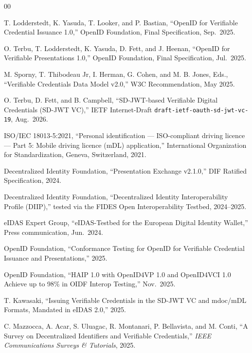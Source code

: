 \documentclass[conference]{IEEEtran}
\begin{document}
\begin{thebibliography}{00}

 T. Lodderstedt, K. Yasuda, T. Looker, and P. Bastian, ``OpenID for Verifiable Credential Issuance 1.0,'' OpenID Foundation, Final Specification, Sep.\ 2025.

 O. Terbu, T. Lodderstedt, K. Yasuda, D. Fett, and J. Heenan, ``OpenID for Verifiable Presentations 1.0,'' OpenID Foundation, Final Specification, Jul.\ 2025.

 M. Sporny, T. Thibodeau Jr, I. Herman, G. Cohen, and M. B. Jones, Eds., ``Verifiable Credentials Data Model v2.0,'' W3C Recommendation, May 2025.

 O. Terbu, D. Fett, and B. Campbell, ``SD-JWT-based Verifiable Digital Credentials (SD-JWT VC),'' IETF Internet-Draft \texttt{draft-ietf-oauth-sd-jwt-vc-19}, Aug.\ 2026.

 ISO/IEC 18013-5:2021, ``Personal identification --- ISO-compliant driving licence --- Part 5: Mobile driving licence (mDL) application,'' International Organization for Standardization, Geneva, Switzerland, 2021.

 Decentralized Identity Foundation, ``Presentation Exchange v2.1.0,'' DIF Ratified Specification, 2024.

 Decentralized Identity Foundation, ``Decentralized Identity Interoperability Profile (DIIP),'' tested via the FIDES Open Interoperability Testbed, 2024--2025.

 eIDAS Expert Group, ``eIDAS-Testbed for the European Digital Identity Wallet,'' Press communication, Jun.\ 2024.

 OpenID Foundation, ``Conformance Testing for OpenID for Verifiable Credential Issuance and Presentations,'' 2025.

 OpenID Foundation, ``HAIP 1.0 with OpenID4VP 1.0 and OpenID4VCI 1.0 Achieve up to 98\% in OIDF Interop Testing,'' Nov.\ 2025.

 T. Kawasaki, ``Issuing Verifiable Credentials in the SD-JWT VC and mdoc/mDL Formats, Mandated in eIDAS 2.0,'' 2025.

 C. Mazzocca, A. Acar, S. Uluagac, R. Montanari, P. Bellavista, and M. Conti, ``A Survey on Decentralized Identifiers and Verifiable Credentials,'' \emph{IEEE Communications Surveys \& Tutorials}, 2025.


\end{thebibliography}
\end{document}
